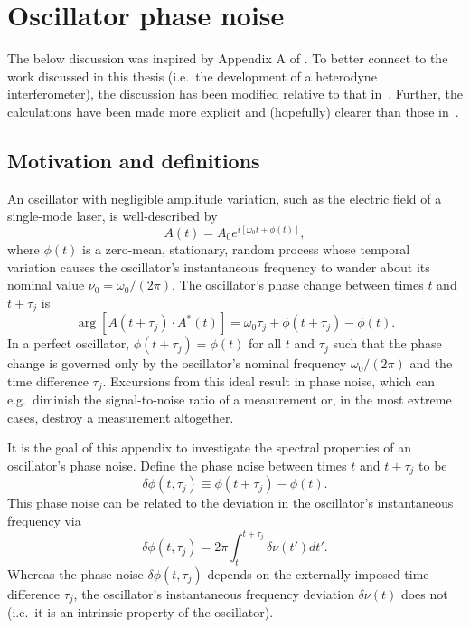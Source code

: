 \chapter{Oscillator phase noise}
The below discussion was inspired by Appendix A of
\cite{stephan_pra05}.
To better connect to the work discussed in this thesis
(i.e.\ the development of a heterodyne interferometer),
the discussion has been modified relative to that in~\cite{stephan_pra05}.
Further, the calculations have been made more explicit and
(hopefully) clearer than those in~\cite{stephan_pra05}.


\section{Motivation and definitions}
An oscillator with negligible amplitude variation,
such as the electric field of a single-mode laser,
is well-described by
\begin{equation}
  A(t) = A_0 e^{i [\omega_0 t + \phi(t)]},
\end{equation}
where $\phi(t)$ is a zero-mean, stationary, random process
whose temporal variation causes
the oscillator's instantaneous frequency
to wander about its nominal value $\nu_0 = \omega_0 / (2 \pi)$.
The oscillator's phase change between
times $t$ and $t + \tau_j$ is
\begin{equation}
  \arg[A(t + \tau_j) \cdot A^*(t)]
  =
  \omega_0 \tau_j + \phi(t + \tau_j) - \phi(t).
\end{equation}
In a perfect oscillator,
$\phi(t + \tau_j) = \phi(t)$ for all $t$ and $\tau_j$
such that the phase change is governed only by
the oscillator's nominal frequency $\omega_0 / (2 \pi)$ and
the time difference $\tau_j$.
Excursions from this ideal result in phase noise, which can e.g.\
diminish the signal-to-noise ratio of a measurement or,
in the most extreme cases, destroy a measurement altogether.

It is the goal of this appendix
to investigate the spectral properties
of an oscillator's phase noise.
Define the phase noise between times $t$ and $t + \tau_j$ to be
\begin{equation}
  \delta \phi(t, \tau_j)
  \equiv
  \phi(t + \tau_j) - \phi(t).
\end{equation}
This phase noise can be related to
the deviation in the oscillator's instantaneous frequency via
\begin{equation}
  \delta \phi(t, \tau_j)
  =
  2 \pi \int_{t}^{t + \tau_j} \delta \nu(t') dt'.
  \label{eq:OscillatorPhaseNoise:phase_noise_from_frequency_deviation}
\end{equation}
Whereas the phase noise $\delta \phi(t, \tau_j)$
depends on the externally imposed time difference $\tau_j$,
the oscillator's instantaneous frequency deviation $\delta \nu(t)$ does not
(i.e.\ it is an intrinsic property of the oscillator).


